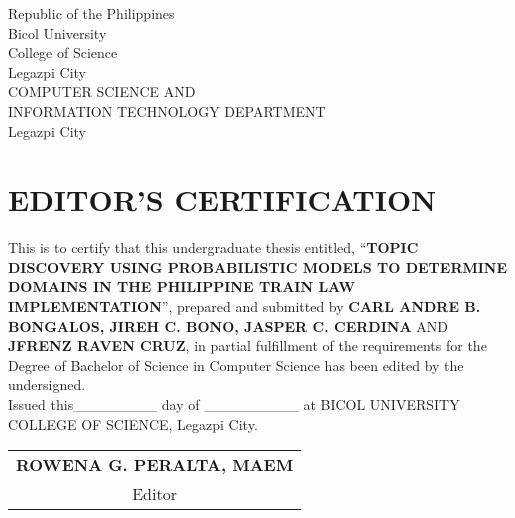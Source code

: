 %

\begin{center}
	{   Republic of the Philippines \\
		Bicol University \\
		College of Science \\
		Legazpi City \\
		COMPUTER SCIENCE AND\\
		INFORMATION TECHNOLOGY DEPARTMENT\\
		Legazpi City\\[0.1ex]}
\end{center} 

\section{\normalsize{EDITOR'S CERTIFICATION}}
		
		This is to certify that this undergraduate thesis entitled, “\textbf{TOPIC DISCOVERY USING PROBABILISTIC MODELS TO DETERMINE DOMAINS IN THE PHILIPPINE TRAIN LAW IMPLEMENTATION}”, prepared and submitted by \textbf{CARL ANDRE B. BONGALOS, JIREH C. BONO, JASPER C. CERDINA} AND \textbf{JFRENZ RAVEN CRUZ}, in partial fulfillment of the requirements for the Degree of Bachelor of Science in Computer Science has been edited by the undersigned.\\[10pt]
		 
		 
		Issued this\_\_\_\_\_\_\_\_ day of \_\_\_\_\_\_\_\_\_ at BICOL UNIVERSITY COLLEGE OF SCIENCE, Legazpi City.\\[80pt]

	

	
	
\begin{flushright}
    \begin{tabular}{c}
    	\textbf{ROWENA G. PERALTA, MAEM}\\
        Editor
    \end{tabular}
\end{flushright}

%